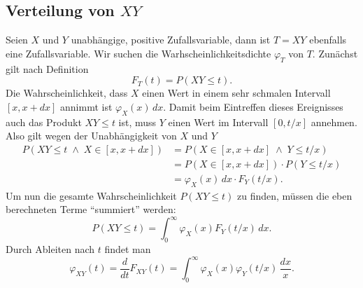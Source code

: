 \subsection{Verteilung von \texorpdfstring{$XY$}{XY}} \label{verteilungsfunktion-produkt}
Seien $X$ und $Y$ unabhängige, positive Zufallsvariable, dann ist $T=XY$
ebenfalls eine Zufallsvariable.
Wir suchen die Warhscheinlichkeitsdichte $\varphi_T$ von $T$.
Zunächst gilt nach Definition
\[
F_T(t)=P(XY\le t).
\]
Die Wahrscheinlichkeit, dass $X$ einen Wert in einem sehr schmalen Intervall
$[x,x+dx]$ annimmt ist $\varphi_X(x)\,dx$.
Damit beim Eintreffen dieses Ereignisses auch das Produkt
$XY\le t$ ist, muss $Y$ einen Wert im Intervall $[0,t/x]$ annehmen.
Also gilt wegen der Unabhängigkeit von $X$ und $Y$
\begin{align*}
P(XY\le t\;\wedge\; X\in[x,x+dx])&=P(X\in[x,x+dx]\;\wedge\; Y\le t/x)\\
&=P(X\in[x,x+dx])\cdot P(Y\le t/x)\\
&=\varphi_X(x)\,dx\cdot F_Y(t/x).
\end{align*}
Um nun die gesamte Wahrscheinlichkeit $P(XY\le t)$ zu finden, müssen die eben
berechneten Terme ``summiert'' werden:
\[
P(XY\le t)=\int_0^\infty\varphi_X(x)F_Y(t/x)\,dx.
\]
Durch Ableiten nach $t$ findet man
\[
\varphi_{XY}(t)=\frac{d}{dt}F_{XY}(t)=\int_0^\infty \varphi_X(x)\varphi_Y(t/x)\,\frac{dx}x.
\]



